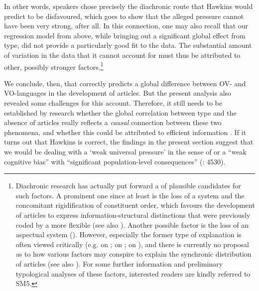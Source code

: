 \documentclass[output=paper]{langsci/langscibook}
\begin{document}
In other words,  speakers chose precisely the diachronic route that Hawkins would predict to be disfavoured, which goes to show that the alleged  pressure cannot have been very strong, after all. In this connection, one may also recall that our regression model from above, while bringing out a significant global effect from  type, did not provide a particularly good fit to the data. The substantial amount of variation in the data that it cannot account for must thus be attributed to other, possibly stronger factors.\footnote{Diachronic research has actually put forward a  of plausible candidates for such factors. A prominent one since at least \citet{Vennemann1975_Drift} is the loss of a  system and the concomitant rigidification of constituent order, which favours the development of articles to express information-structural distinctions that were previously coded by a more flexible  (see also \citealt{Hawkins2004_Eff,HewsonBubenik2006,Fischer2010_WOChange,CarlierLamiroy2014}). Another possible factor is the loss of an aspectual system (\citealt{Abraham1997_Asp,Leiss2000_Asp,Leiss2007_Def}). However, especially the former type of explanation is often viewed critically (e.g. \citealt{Selig1992_LatDet} on ; \citealt{McCollMillar2000_Def} on ; \citealt{Leiss2000_Asp} on ), and there is currently no proposal as to how various factors may conspire to explain the synchronic distribution of articles (see also \citealt{Lüdtke1991}). For some further information and preliminary typological analyses of these factors, interested readers are kindly referred to SM5.}

We conclude, then, that \citet{Hawkins2014_VarEff} correctly predicts a global difference between OV- and VO-languages in the development of articles. But the present analysis also revealed some challenges for this account. Therefore, it still needs to be established by  research whether the global correlation between  type and the absence of articles really reflects a \textit{causal} connection between these two phenomena, and whether this could be attributed to efficient information . If it turns out that Hawkins is correct, the findings in the present section suggest that we would be dealing with a ‘weak universal pressure’ in the sense of  or a “weak cognitive bias” with “significant population-level consequences” (\citealt{ThompsonEtAl2016}: 4530).
\end{document}
